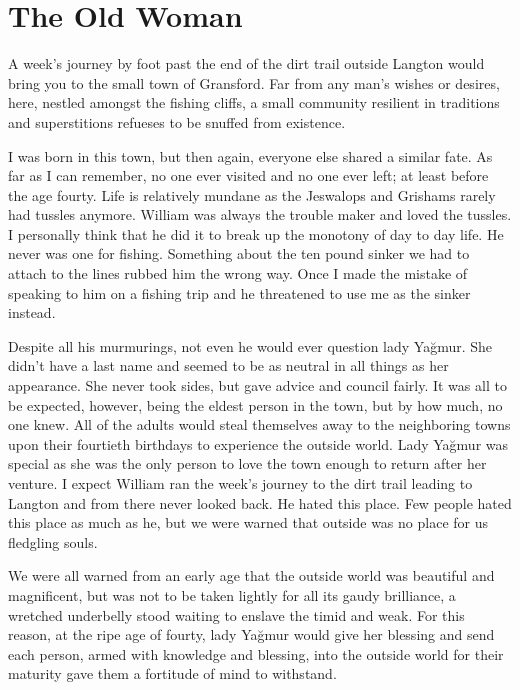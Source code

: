 \chapter*{The Old Woman}


A week's journey by foot past the end of the dirt trail outside Langton would bring you to the small
town of Gransford. Far from any man's wishes or desires, here, nestled amongst the fishing
cliffs, a small community resilient in traditions and superstitions refueses to be snuffed from
existence.

I was born in this town, but then again, everyone else shared a similar fate. As far as I can
remember, no one ever visited and no one ever left; at least before the age fourty. Life is
relatively mundane as the Jeswalops and Grishams rarely had tussles anymore. William was always the
trouble maker and loved the tussles. I personally think that he did it to break up the monotony of
day to day life. He never was one for fishing. Something about the ten pound sinker we had to attach
to the lines rubbed him the wrong way. Once I made the mistake of speaking to him on a fishing trip
and he threatened to use me as the sinker instead.

Despite all his murmurings, not even he would ever question lady Yağmur. She didn't have a last name
and seemed to be as neutral in all things as her appearance. She never took sides, but gave advice
and council fairly. It was all to be expected, however, being the eldest person in the town, but by
how much, no one knew. All of the adults would steal themselves away to the neighboring towns upon
their fourtieth birthdays to experience the outside world. Lady Yağmur was special as she was the
only person to love the town enough to return after her venture. I expect William ran the week's
journey to the dirt trail leading to Langton and from there never looked back. He hated this place.
Few people hated this place as much as he, but we were warned that outside was no place for us
fledgling souls.

We were all warned from an early age that the outside world was beautiful and magnificent, but was
not to be taken lightly for all its gaudy brilliance, a wretched underbelly stood waiting to enslave
the timid and weak. For this reason, at the ripe age of fourty, lady Yağmur would give her blessing
and send each person, armed with knowledge and blessing, into the outside world for their maturity
gave them a fortitude of mind to withstand.

